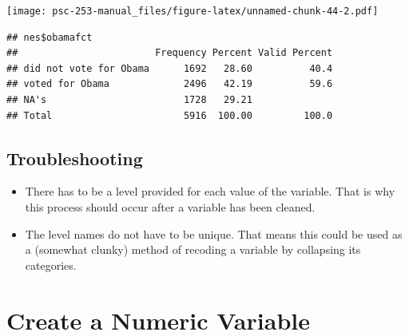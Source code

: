 \documentclass[
]{book}
\newenvironment{Shaded}{\begin{snugshade}}{\end{snugshade}}
\newcommand{\CommentTok}[1]{\textcolor[rgb]{0.56,0.35,0.01}{\textit{#1}}}
\newcommand{\FunctionTok}[1]{\textcolor[rgb]{0.00,0.00,0.00}{#1}}
\newcommand{\NormalTok}[1]{#1}
\newcommand{\OtherTok}[1]{\textcolor[rgb]{0.56,0.35,0.01}{#1}}
\newcommand{\SpecialCharTok}[1]{\textcolor[rgb]{0.00,0.00,0.00}{#1}}
\newcommand{\StringTok}[1]{\textcolor[rgb]{0.31,0.60,0.02}{#1}}
\begin{document}
\begin{Shaded}
\end{Shaded}

\texttt{[image: psc-253-manual\_files/figure-latex/unnamed-chunk-44-2.pdf]}

\begin{verbatim}
## nes$obamafct 
##                        Frequency Percent Valid Percent
## did not vote for Obama      1692   28.60          40.4
## voted for Obama             2496   42.19          59.6
## NA's                        1728   29.21              
## Total                       5916  100.00         100.0
\end{verbatim}

\hypertarget{troubleshooting-14}{%
\subsection{Troubleshooting}\label{troubleshooting-14}}

\begin{itemize}
\item
  There has to be a level provided for each value of the variable. That is why this process should occur after a variable has been cleaned.
\item
  The level names do not have to be unique. That means this could be used as a (somewhat clunky) method of recoding a variable by collapsing its categories.
\end{itemize}

\hypertarget{numeric}{%
\section{Create a Numeric Variable}\label{numeric}}
\end{document}
